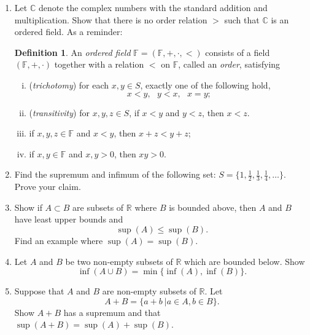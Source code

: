 \documentclass[12pt,letterpaper]{article}
\theoremstyle{plain}
\theoremstyle{definition}
\newtheorem{definition}[theorem]{Definition}
\begin{document}
\begin{enumerate}[1.]
 \item Let $\mathbb{C}$ denote the complex numbers with the standard addition and multiplication. Show that there is no order relation $>$ such that $\mathbb{C}$ is an ordered field. As a reminder:
 \begin{definition}\rm
   An {\it ordered field} $\mathbb{F}=(\mathbb{F},+,\cdot,<)$ consists
   of a field $(\mathbb{F},+,\cdot)$ together with a relation $<$ on $\mathbb{F}$, called
  an \emph{order}, satisfying
  \begin{enumerate}[(i)]
  \item (\emph{trichotomy}) for each $x,y\in S$, exactly one of the following hold,
 $$
   x<y, \ \ \ y<x, \ \ \ x=y;
 $$
  \item (\emph{transitivity}) for $x,y,z\in S$, 
   if $x<y$ and $y<z$, then $x<z$.
   \item if $x,y,z\in \mathbb{F}$ and $x<y$, then $x+z<y+z$;
   \item if $x,y\in \mathbb{F}$ and $x,y>0$, then $xy>0$.
  \end{enumerate} 
\end{definition} 
 \item Find the supremum and infimum of the following set: $S=\{1,\frac{1}{2}, \frac{1}{3},\frac{1}{4},\ldots\}$. Prove your claim. 
\item Show if $A\subset B$ are subsets of $\mathbb{R}$ where $B$ is bounded above, then $A$ and $B$ have least upper bounds and 
\[\sup(A)\leq \sup(B).\]
Find an example where $\sup(A)=\sup(B)$.  
 \item Let $A$ and $B$ be two non-empty subsets of $\mathbb{R}$ which are bounded below. 
 Show \[\inf(A\cup B)=\min\{\inf(A),\inf(B)\}.\]
\item Suppose that $A$ and $B$ are non-empty subsets of $\mathbb{R}$. Let 
\[A+B=\{a+b\ | a\in A, b\in B\}.\]
Show $A+B$ has a supremum and that $\sup(A+B)=\sup(A)+\sup(B)$. 


 \end{enumerate}
\end{document}
